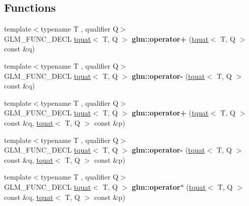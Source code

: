 \subsection*{Functions}
\begin{DoxyCompactItemize}
\item 
\mbox{\label{group__gtc__quaternion_ga415c33d49346428f93089f80cf8f9187}} 
{\footnotesize template$<$typename T , qualifier Q$>$ }\\G\+L\+M\+\_\+\+F\+U\+N\+C\+\_\+\+D\+E\+CL \hyperlink{structglm_1_1tquat}{tquat}$<$ T, Q $>$ {\bfseries glm\+::operator+} (\hyperlink{structglm_1_1tquat}{tquat}$<$ T, Q $>$ const \&q)
\item 
\mbox{\label{group__gtc__quaternion_ga594339bbf8d9d11ec27ada0502d4eeaf}} 
{\footnotesize template$<$typename T , qualifier Q$>$ }\\G\+L\+M\+\_\+\+F\+U\+N\+C\+\_\+\+D\+E\+CL \hyperlink{structglm_1_1tquat}{tquat}$<$ T, Q $>$ {\bfseries glm\+::operator-\/} (\hyperlink{structglm_1_1tquat}{tquat}$<$ T, Q $>$ const \&q)
\item 
\mbox{\label{group__gtc__quaternion_ga90911b1428a0a773fa9e0c0952ce25fd}} 
{\footnotesize template$<$typename T , qualifier Q$>$ }\\G\+L\+M\+\_\+\+F\+U\+N\+C\+\_\+\+D\+E\+CL \hyperlink{structglm_1_1tquat}{tquat}$<$ T, Q $>$ {\bfseries glm\+::operator+} (\hyperlink{structglm_1_1tquat}{tquat}$<$ T, Q $>$ const \&q, \hyperlink{structglm_1_1tquat}{tquat}$<$ T, Q $>$ const \&p)
\item 
\mbox{\label{group__gtc__quaternion_ga004ef8d57d8c50ec4356e2b8a43e93af}} 
{\footnotesize template$<$typename T , qualifier Q$>$ }\\G\+L\+M\+\_\+\+F\+U\+N\+C\+\_\+\+D\+E\+CL \hyperlink{structglm_1_1tquat}{tquat}$<$ T, Q $>$ {\bfseries glm\+::operator-\/} (\hyperlink{structglm_1_1tquat}{tquat}$<$ T, Q $>$ const \&q, \hyperlink{structglm_1_1tquat}{tquat}$<$ T, Q $>$ const \&p)
\item 
\mbox{\label{group__gtc__quaternion_ga447cda99bd10c12696177d490049a8f5}} 
{\footnotesize template$<$typename T , qualifier Q$>$ }\\G\+L\+M\+\_\+\+F\+U\+N\+C\+\_\+\+D\+E\+CL \hyperlink{structglm_1_1tquat}{tquat}$<$ T, Q $>$ {\bfseries glm\+::operator$\ast$} (\hyperlink{structglm_1_1tquat}{tquat}$<$ T, Q $>$ const \&q, \hyperlink{structglm_1_1tquat}{tquat}$<$ T, Q $>$ const \&p)

\end{DoxyCompactItemize}
